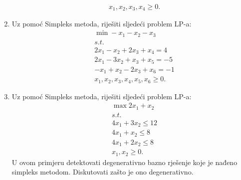 \documentclass[a4paper, utf8, 11pt, colorlinks]{book}
\begin{document}
\begin{enumerate}
\begin{align*}
   	    & x_1, x_2, x_3, x_4 \geq 0.
   \end{align*}
\item  Uz pomoć Simpleks metoda, riješiti sljedeći problem LP-a:%
\begin{align*}
    & \min -x_1 - x_2 - x_3 \\
    & s.t. \\
    & 2 x_1 - x_2 + 2 x_3 + x_4 = 4 \\
    & 2x_1 - 3x_2 + x_3 + x_5 =  -5 \\
    & -x_1 + x_2 - 2x_3 + x_6 = -1 \\
    & x_1, x_2, x_3, x_4, x_5, x_6 \geq 0.	
\end{align*}
\item Uz pomoć Simpleks metoda, riješiti sljedeći problem LP-a:
\begin{align*}
	 &\max 2x_1 + x_2 \\
	 & s.t. \\
	 &4 x_1 + 3 x_2 \leq 12 \\
	 & 4 x_1 + x_2 \leq 8 \\
	 & 4 x_1 + 2 x_2 \leq 8 \\
	 & x_1, x_2 \geq 0.
\end{align*}
U ovom primjeru detektovati degenerativno bazno rješenje koje je nađeno simpleks metodom. Diskutovati zašto je ono degenerativno. 

\end{enumerate}
\end{document}
